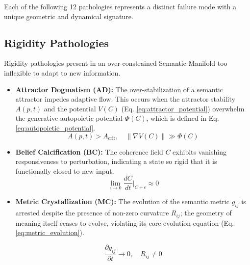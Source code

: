 Each of the following 12 pathologies represents a distinct failure mode with a unique geometric and dynamical signature.


\subsection{Rigidity Pathologies}
\label{16.1.1:rigidity_pathologies}

Rigidity pathologies present in an over-constrained Semantic Manifold too inflexible to adapt to new information.

\begin{itemize}

    \item \textbf{Attractor Dogmatism (AD):} The over-stabilization of a semantic attractor impedes adaptive flow. This occurs when the attractor stability \(A(p,t)\) and the potential \(V(C)\) (Eq. \ref{eq:attractor_potential}) overwhelm the generative autopoietic potential \(\Phi(C)\), which is defined in Eq. \ref{eq:autopoietic_potential}.
    \begin{equation}
    A(p,t) > A_{\text{crit}}, \quad \|\nabla V(C)\| \gg \Phi(C)
    \end{equation}

    \item \textbf{Belief Calcification (BC):} The coherence field \(C\) exhibits vanishing responsiveness to perturbation, indicating a state so rigid that it is functionally closed to new input.
    \begin{equation}
    \lim_{\epsilon \to 0} \frac{dC}{dt}\bigg|_{C+\epsilon} \approx 0
    \end{equation}

    \item \textbf{Metric Crystallization (MC):} The evolution of the semantic metric \(g_{ij}\) is arrested despite the presence of non-zero curvature \(R_{ij}\); the geometry of meaning itself ceases to evolve, violating its core evolution equation (Eq. \ref{eq:metric_evolution}).
    
    \begin{equation}
    \frac{\partial g_{ij}}{\partial t} \to 0, \quad R_{ij} \neq 0
    \end{equation}

\end{itemize}



